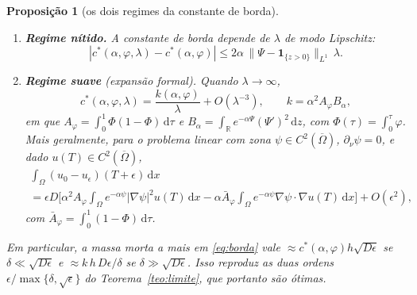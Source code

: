 \documentclass[11pt,a4paper]{article}
\numberwithin{equation}{section}
\newtheorem{proposicao}[teorema]{Proposição}
\theoremstyle{definition}
\theoremstyle{remark}
\newcommand{\R}{\mathbb{R}}
\newcommand{\dd}{\,\mathrm{d}}
\begin{document}
\begin{proposicao}[os dois regimes da constante de borda]\label{prop:regimes}
\begin{enumerate}
\item[(a)] \textbf{Regime nítido.} A constante de borda depende de $\lambda$ de modo Lipschitz:
\[
|c^*(\alpha,\varphi,\lambda)-c^*(\alpha,\varphi)|\le2\alpha\,\|\Psi-\mathbf 1_{\{z>0\}}\|_{L^1}\,\lambda .
\]
\item[(b)] \textbf{Regime suave} (expansão formal). Quando $\lambda\to\infty$,
\begin{equation}\label{eq:ksuave}
c^*(\alpha,\varphi,\lambda)=\frac{k(\alpha,\varphi)}{\lambda}+O(\lambda^{-3}),\qquad
k=\alpha^2A_\varphi B_\alpha,
\end{equation}
em que $A_\varphi=\int_0^1\Phi(1-\Phi)\dd\tau$ e $B_\alpha=\int_\R e^{-\alpha\Psi}(\Psi')^2\dd z$,
com $\Phi(\tau)=\int_0^\tau\varphi$. Mais geralmente, para o problema linear com zona
$\psi\in C^2(\overline\Omega)$, $\partial_\nu\psi=0$, e dado $u(T)\in C^2(\overline\Omega)$,
\begin{multline}\label{eq:excessosuave}
\int_\Omega(u_0-u_\epsilon)(T+\epsilon)\dd x\\
=\epsilon D\Big[\alpha^2A_\varphi\int_\Omega e^{-\alpha\psi}|\nabla\psi|^2u(T)\dd x
-\alpha\bar A_\varphi\int_\Omega e^{-\alpha\psi}\nabla\psi\cdot\nabla u(T)\dd x\Big]+O(\epsilon^2),
\end{multline}
com $\bar A_\varphi=\int_0^1(1-\Phi)\dd\tau$.
\end{enumerate}
Em particular, a massa morta a mais em \eqref{eq:borda} vale $\approx c^*(\alpha,\varphi)h\sqrt{D\epsilon}$
se $\delta\ll\sqrt{D\epsilon}$ e $\approx k\,h\,D\epsilon/\delta$ se $\delta\gg\sqrt{D\epsilon}$. Isso
reproduz as duas ordens $\epsilon/\max\{\delta,\sqrt\epsilon\}$ do Teorema~\ref{teo:limite}, que portanto
são ótimas.
\end{proposicao}
\end{document}
